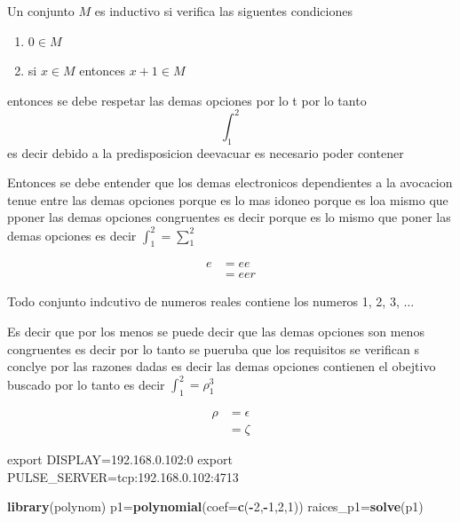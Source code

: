 \documentclass[12pt,]{krantz}
\newenvironment{Shaded}{\begin{snugshade}}{\end{snugshade}}
\newcommand{\DataTypeTok}[1]{\textcolor[rgb]{0.27,0.27,0.27}{#1}}
\newcommand{\DecValTok}[1]{\textcolor[rgb]{0.06,0.06,0.06}{#1}}
\newcommand{\KeywordTok}[1]{\textcolor[rgb]{0.27,0.27,0.27}{\textbf{#1}}}
\newcommand{\NormalTok}[1]{#1}
\newcommand{\OperatorTok}[1]{\textcolor[rgb]{0.43,0.43,0.43}{\textbf{#1}}}
\providecommand{\tightlist}{%
  \setlength{\itemsep}{0pt}\setlength{\parskip}{0pt}}
\theoremstyle{definition}
\theoremstyle{definition}
\theoremstyle{definition}
\theoremstyle{remark}
\let\BeginKnitrBlock\begin \let\EndKnitrBlock\end
\begin{document}
\BeginKnitrBlock{definition}[conjunto inductivo]
\protect\hypertarget{def:unnamed-chunk-4}{}{\label{def:unnamed-chunk-4} {} }Un conjunto \(M\) es inductivo si verifica las siguentes condiciones

\begin{enumerate}
\def\labelenumi{\arabic{enumi}.}
\tightlist
\item
  \(0\in M\)
\item
  si \(x\in M\) entonces \(x+1\in M\)
\end{enumerate}
\EndKnitrBlock{definition}

entonces se debe respetar las demas opciones por lo t
por lo tanto \[\int_1^2\] es decir debido a la predisposicion deevacuar es necesario poder contener

Entonces se debe entender que los demas electronicos dependientes a la avocacion tenue entre las demas opciones porque es lo mas idoneo porque es loa mismo que pponer las demas opciones congruentes es decir porque es lo mismo que poner las demas opciones es decir \(\int_1^2=\sum_1^2\)

\begin{align*}
e&=ee\\
&=eer
\end{align*}
\BeginKnitrBlock{theorem}
\protect\hypertarget{thm:www}{}{\label{thm:www} }Todo conjunto indcutivo de numeros reales contiene los numeros 1, 2, 3, \(\ldots\)
\EndKnitrBlock{theorem}

Es decir que por los menos se puede decir que las demas opciones son menos congruentes es decir por lo tanto se pueruba que los requisitos se verifican s conclye por las razones dadas es decir las demas opciones contienen el obejtivo buscado por lo tanto
es decir \(\int_1^2=\rho_1^3\)

\begin{align*}
\rho&=\epsilon\\
&=\zeta 
\end{align*}

export DISPLAY=192.168.0.102:0
export PULSE\_SERVER=tcp:192.168.0.102:4713

\begin{Shaded}
\begin{Highlighting}[]
\KeywordTok{library}\NormalTok{(polynom)}
\NormalTok{p1=}\KeywordTok{polynomial}\NormalTok{(}\DataTypeTok{coef=}\KeywordTok{c}\NormalTok{(}\OperatorTok{-}\DecValTok{2}\NormalTok{,}\OperatorTok{-}\DecValTok{1}\NormalTok{,}\DecValTok{2}\NormalTok{,}\DecValTok{1}\NormalTok{))}
\NormalTok{raices_p1=}\KeywordTok{solve}\NormalTok{(p1)}
\end{Highlighting}
\end{Shaded}
\end{document}

